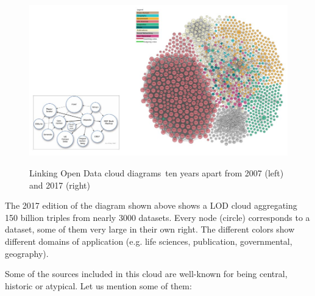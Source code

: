\begin{figure}
\includegraphics[width=5.0in]{media/ch5/figure-05-14.jpg}
\label{fig:ch5.14}
\caption{Linking Open Data cloud diagrams\protect\footnotemark\ ten years apart from 2007 (left) and 2017 (right)}
\end{figure}

The 2017 edition of the diagram shown above shows a LOD cloud
aggregating 150 billion triples from nearly 3000 datasets. Every node
(circle) corresponds to a dataset, some of them very large in their own
right. The different colors show different domains of application (e.g.
life sciences, publication, governmental, geography).

Some of the sources included in this cloud are well-known for being
central, historic or atypical. Let us mention some of them:

